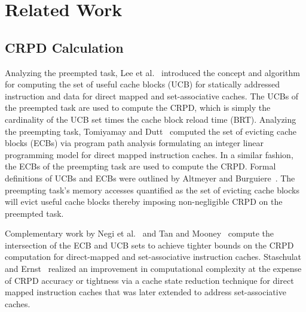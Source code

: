 \section{Related Work}\label{sec:related}

\subsection {CRPD Calculation}\label{sec:crpd_related_work}
Analyzing the preempted task, Lee et al.~\cite{lee:96,lee:97,lee:98} introduced the concept and algorithm for computing the set of useful cache blocks (UCB) for statically addressed instruction and data for direct mapped and set-associative caches.
The UCBs of the preempted task are used to compute the CRPD, which is simply the cardinality of the UCB set times the cache block reload time (BRT).
\newline
\indent
Analyzing the preempting task, Tomiyamay and Dutt~\cite{tomiyamay:00} computed the set of evicting cache blocks (ECBs) via program path analysis formulating an integer linear programming model for direct mapped instruction caches.
In a similar fashion, the ECBs of the preempting task are used to compute the CRPD.
Formal definitions of UCBs and ECBs were outlined by Altmeyer and Burguiere~\cite{altmeyer:11c}.  The preempting task’s memory accesses quantified as the set of evicting cache blocks will evict useful cache blocks thereby imposing non-negligible CRPD on the preempted task.

Complementary work by Negi et al.~\cite{negi:03} and Tan and Mooney~\cite{tan:04} compute the intersection of the ECB and UCB sets to achieve tighter bounds on the CRPD computation for direct-mapped and set-associative instruction caches.
Staschulat and Ernst~\cite{staschulat:05c} realized an improvement in computational complexity at the expense of CRPD accuracy or tightness via a cache state reduction technique for direct mapped instruction caches that was later extended to address set-associative caches.

